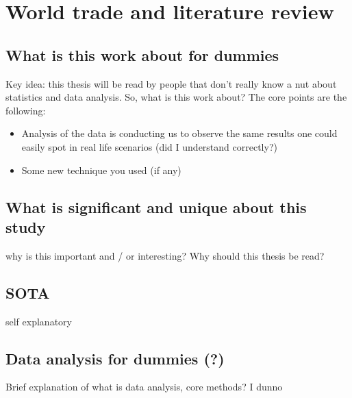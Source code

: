 \chapter{World trade and literature review}

\section{What is this work about for dummies}
Key idea: this thesis will be read by people that don't really know a nut about statistics and data analysis. 
So, what is this work about? 
The core points are the following:
\begin{itemize}
    \item Analysis of the data is conducting us to observe the same results one could easily spot in real life scenarios (did I understand correctly?)
    \item Some new technique you used (if any)
\end{itemize}
\section{What is significant and unique about this study}
why is this important and / or interesting? Why should this thesis be read?
\section{SOTA}
self explanatory
\section{Data analysis for dummies (?)}
Brief explanation of what is data analysis, core methods? I dunno
